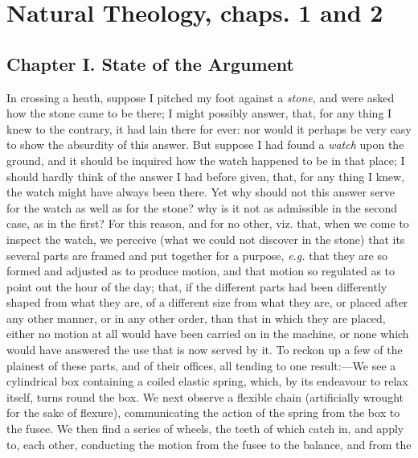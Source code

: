 
\author{William Paley}
\chapter[William Paley -- Natural Theology, chaps. 1 and 2]{Natural
Theology, chaps. 1 and 2}


\section*{Chapter I. State of the Argument}

In crossing a heath, suppose I pitched my foot against a
\textit{stone}, and were asked how the stone came to be there; I might
possibly answer, that, for any thing I knew to the contrary, it had
lain there for ever: nor would it perhaps be very easy to show the
absurdity of this answer. But suppose I had found a \textit{watch}
upon the ground, and it should be inquired how the watch happened to
be in that place; I should hardly think of the answer I had before
given, that, for any thing I knew, the watch might have always been
there. Yet why should not this answer serve for the watch as well as
for the stone? why is it not as admissible in the second case, as in
the first? For this reason,  and for no other, viz. that, when
we come to inspect the watch, we perceive (what we could not discover
in the stone) that its several parts are framed and put together for a
purpose, \textit{e.g.} that they are so formed and adjusted as to
produce motion, and that motion so regulated as to point out the hour
of the day; that, if the different parts had been differently shaped
from what they are, of a different size from what they are, or placed
after any other manner, or in any other order, than that in which they
are placed, either no motion at all would have been carried on in the
machine, or none which would have answered the use that is now served
by it. To reckon up a few of the plainest of these parts, and of their
offices, all tending to one re\-sult:---We see a cylindrical box
containing a coiled elastic spring, which, by its endeavour to relax
itself, turns round the box. We next observe a flexible chain
(artificially wrought for the sake of flexure), communicating the
action of the spring from the box to the fusee. We then find a series
of wheels, the teeth of which catch in, and apply to, each other,
conducting the motion from the fusee to the balance, and from the
